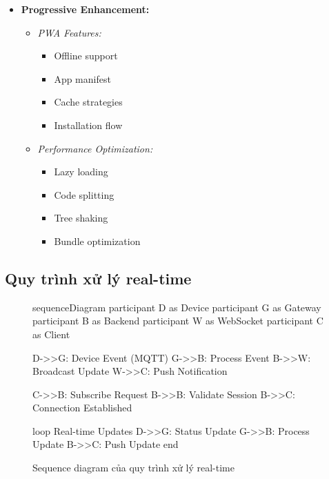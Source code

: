 \begin{itemize}
    \item \textbf{Progressive Enhancement:}
    \begin{itemize}
        \item \textit{PWA Features:}
        \begin{itemize}
            \item Offline support
            \item App manifest
            \item Cache strategies
            \item Installation flow
        \end{itemize}
        \item \textit{Performance Optimization:}
        \begin{itemize}
            \item Lazy loading
            \item Code splitting
            \item Tree shaking
            \item Bundle optimization
        \end{itemize}
    \end{itemize}
\end{itemize}

\subsection{Quy trình xử lý real-time}
\begin{figure}[h]
\begin{mermaid}
sequenceDiagram
    participant D as Device
    participant G as Gateway
    participant B as Backend
    participant W as WebSocket
    participant C as Client
    
    D->>G: Device Event (MQTT)
    G->>B: Process Event
    B->>W: Broadcast Update
    W->>C: Push Notification
    
    C->>B: Subscribe Request
    B->>B: Validate Session
    B->>C: Connection Established
    
    loop Real-time Updates
        D->>G: Status Update
        G->>B: Process Update
        B->>C: Push Update
    end
\end{mermaid}
\caption{Sequence diagram của quy trình xử lý real-time}
\end{figure}

